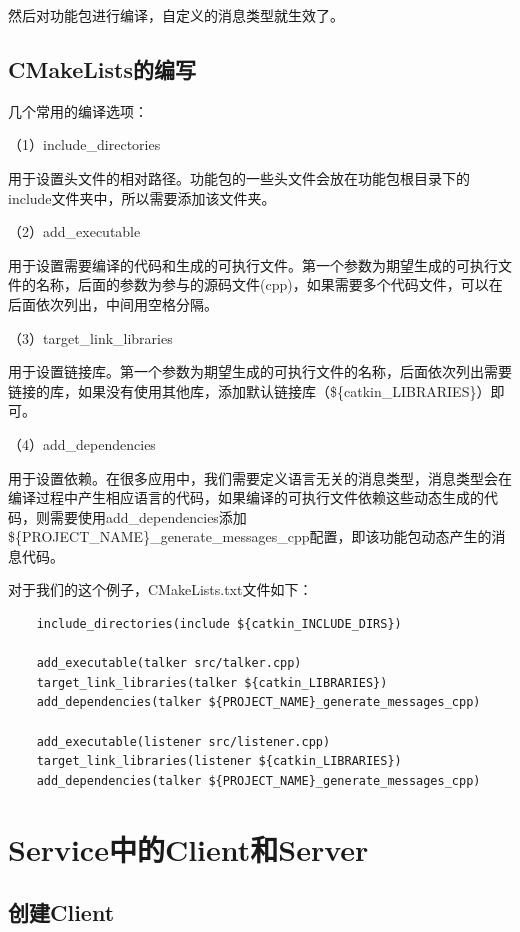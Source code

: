 \documentclass[9pt, oneside]{book}
\begin{document}
然后对功能包进行编译，自定义的消息类型就生效了。

\subsection{CMakeLists的编写}

几个常用的编译选项：

（1）include\_directories

用于设置头文件的相对路径。功能包的一些头文件会放在功能包根目录下的include文件夹中，所以需要添加该文件夹。

（2）add\_executable

用于设置需要编译的代码和生成的可执行文件。第一个参数为期望生成的可执行文件的名称，后面的参数为参与的源码文件(cpp)，如果需要多个代码文件，可以在后面依次列出，中间用空格分隔。

（3）target\_link\_libraries

用于设置链接库。第一个参数为期望生成的可执行文件的名称，后面依次列出需要链接的库，如果没有使用其他库，添加默认链接库（\$\{catkin\_LIBRARIES\}）即可。

（4）add\_dependencies

用于设置依赖。在很多应用中，我们需要定义语言无关的消息类型，消息类型会在编译过程中产生相应语言的代码，如果编译的可执行文件依赖这些动态生成的代码，则需要使用add\_dependencies添加\$\{PROJECT\_NAME\}\_generate\_messages\_cpp配置，即该功能包动态产生的消息代码。

对于我们的这个例子，CMakeLists.txt文件如下：

\begin{verbatim}
    include_directories(include ${catkin_INCLUDE_DIRS})

    add_executable(talker src/talker.cpp)
    target_link_libraries(talker ${catkin_LIBRARIES})
    add_dependencies(talker ${PROJECT_NAME}_generate_messages_cpp)
      
    add_executable(listener src/listener.cpp)
    target_link_libraries(listener ${catkin_LIBRARIES})
    add_dependencies(talker ${PROJECT_NAME}_generate_messages_cpp)
\end{verbatim}

\section{Service中的Client和Server}

\subsection{创建Client}
\end{document}
